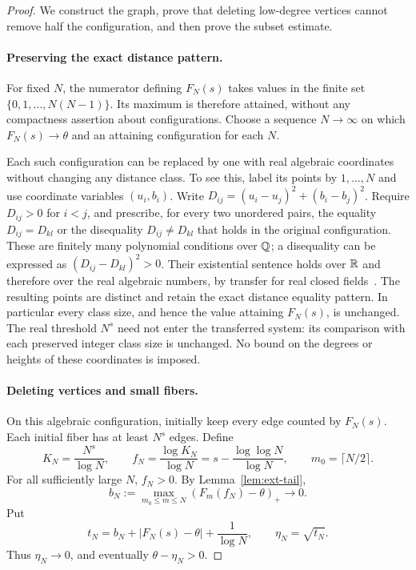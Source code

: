 \begin{proof}
We construct the graph, prove that deleting low-degree vertices cannot
remove half the configuration, and then prove the subset estimate.

\paragraph{Preserving the exact distance pattern.}
For fixed $N$, the numerator defining $F_N(s)$ takes values in the
finite set $\{0,1,\ldots,N(N-1)\}$. Its maximum is therefore attained,
without any compactness assertion about configurations. Choose a
sequence $N\to\infty$ on which $F_N(s)\to\theta$ and an attaining
configuration for each $N$.

Each such configuration can be replaced by one with real algebraic
coordinates without changing any distance class. To see this, label its
points by $1,\ldots,N$ and use coordinate variables $(u_i,b_i)$. Write
$D_{ij}=(u_i-u_j)^2+(b_i-b_j)^2$. Require $D_{ij}>0$ for $i<j$,
and prescribe, for every two unordered pairs, the equality
$D_{ij}=D_{kl}$ or the disequality $D_{ij}\ne D_{kl}$ that holds in
the original configuration. These are finitely many polynomial
conditions over $\mathbb Q$; a disequality can be expressed as
$(D_{ij}-D_{kl})^2>0$. Their existential sentence holds over $\mathbb R$ and
therefore over the real algebraic numbers, by transfer for real closed
fields~\cite[Theorems~3.1 and~4.1]{RCFTransfer}. The resulting points are
distinct and retain the exact distance equality pattern. In particular every class size,
and hence the value attaining $F_N(s)$, is unchanged. The real threshold
$N^s$ need not enter the transferred system: its comparison with each
preserved integer class size is unchanged. No bound on the
degrees or heights of these coordinates is imposed.

\paragraph{Deleting vertices and small fibers.}
On this algebraic configuration, initially keep every edge counted by
$F_N(s)$. Each initial fiber has at least $N^s$ edges. Define
\[
 K_N=\frac{N^s}{\log N},\qquad
 f_N=\frac{\log K_N}{\log N}
     =s-\frac{\log\log N}{\log N},\qquad
 m_0=\lceil N/2\rceil.
\]
For all sufficiently large $N$, $f_N>0$. By
Lemma~\ref{lem:ext-tail},
\[
 b_N:=\max_{m_0\le m\le N}(F_m(f_N)-\theta)_+\longrightarrow0.
\]
Put
\[
 t_N=b_N+|F_N(s)-\theta|+\frac1{\log N},\qquad
 \eta_N=\sqrt{t_N}.
\]
Thus $\eta_N\to0$, and eventually $\theta-\eta_N>0$.


\end{proof}
